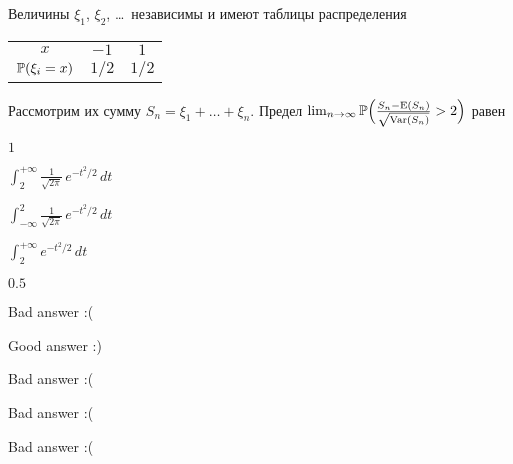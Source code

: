 
\begin{question}
Величины \(\xi_1\), \(\xi_2\), \ldots~независимы и имеют таблицы
распределения

\begin{tabular}{ccc}
\toprule
  $x$                     & $-1$   & $1$   \\ 
  $\P(\xi_i = x)$        & $1/2$       & $1/2$   \\
\bottomrule
\end{tabular}

Рассмотрим их сумму \(S_n = \xi_1 + \ldots + \xi_n\). Предел
\(\lim_{n \to \infty}\P\Bigl(\frac{S_n - \E(S_n)}{\sqrt{\Var(S_n)}} > 2\Bigr)\)
равен
\begin{answerlist}
  \item \(1\)
  \item \(\int_{2}^{+\infty}\frac{1}{\sqrt{2\pi}}\,e^{-t^2/2}\,dt\)
  \item \(\int_{-\infty}^{2}\frac{1}{\sqrt{2\pi}}\,e^{-t^2/2}\,dt\)
  \item \(\int_{2}^{+\infty} e^{-t^2/2}\,dt\)
  \item \(0.5\)
\end{answerlist}
\end{question}

\begin{solution}
\begin{answerlist}
  \item Bad answer :(
  \item Good answer :)
  \item Bad answer :(
  \item Bad answer :(
  \item Bad answer :(
\end{answerlist}
\end{solution}

